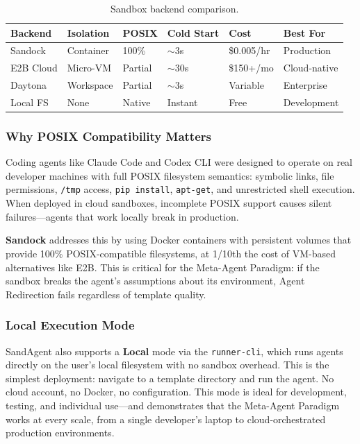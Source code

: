 \begin{table}[h]
\caption{Sandbox backend comparison.}
\label{tab:sandboxes}
\centering
\small
\begin{tabular}{@{}llllll@{}}
\toprule
\textbf{Backend} & \textbf{Isolation} & \textbf{POSIX} & \textbf{Cold Start} & \textbf{Cost} & \textbf{Best For} \\
\midrule
Sandock   & Container & 100\% & $\sim$3s & \$0.005/hr & Production \\
E2B Cloud & Micro-VM & Partial & $\sim$30s & \$150+/mo & Cloud-native \\
Daytona   & Workspace & Partial & $\sim$3s & Variable & Enterprise \\
Local FS  & None & Native & Instant & Free & Development \\
\bottomrule
\end{tabular}
\end{table}

\subsubsection{Why POSIX Compatibility Matters}

Coding agents like Claude Code and Codex CLI were designed to operate on real developer machines with full POSIX filesystem semantics: symbolic links, file permissions, \texttt{/tmp} access, \texttt{pip install}, \texttt{apt-get}, and unrestricted shell execution. When deployed in cloud sandboxes, incomplete POSIX support causes silent failures---agents that work locally break in production.

\textbf{Sandock} \citep{sandock2025} addresses this by using Docker containers with persistent volumes that provide 100\% POSIX-compatible filesystems, at 1/10th the cost of VM-based alternatives like E2B. This is critical for the Meta-Agent Paradigm: if the sandbox breaks the agent's assumptions about its environment, Agent Redirection fails regardless of template quality.

\subsubsection{Local Execution Mode}

SandAgent also supports a \textbf{Local} mode via the \texttt{runner-cli}, which runs agents directly on the user's local filesystem with no sandbox overhead. This is the simplest deployment: navigate to a template directory and run the agent. No cloud account, no Docker, no configuration. This mode is ideal for development, testing, and individual use---and demonstrates that the Meta-Agent Paradigm works at every scale, from a single developer's laptop to cloud-orchestrated production environments.
